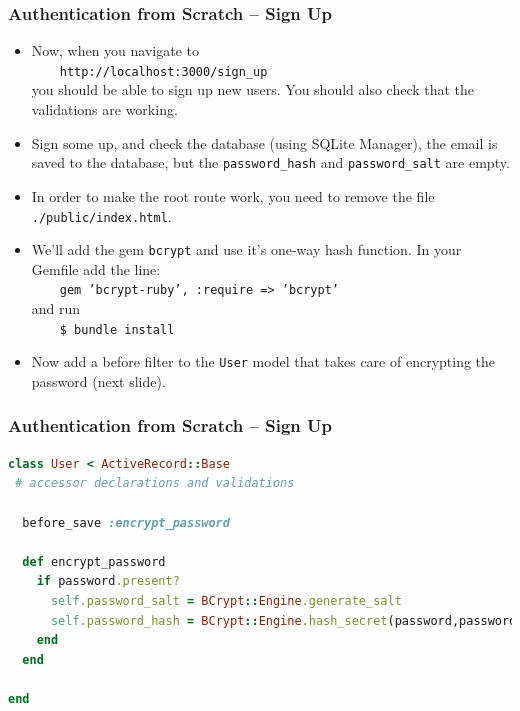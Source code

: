 \documentclass[t,handout]{beamer}
\begin{document}
\begin{frame}\frametitle{Authentication from Scratch -- Sign Up}
{\small
 \begin{itemize}

   \item Now, when you navigate to~\\
    \ \ \ \ {\tt http://localhost:3000/sign\_up} ~\\
    you should be able to sign up new users. \pause You should also check that the validations are working.
   \pause
   \item Sign some up, and check the database (using SQLite Manager), the email is saved to the database, but the {\tt password\_hash} and {\tt password\_salt} are empty.
   \pause
   \item In order to make the root route work, you need to remove the file {\tt ./public/index.html}.
   \pause
   \item We'll add the gem {\tt bcrypt} and use it's one-way hash function.  In your Gemfile add the line:~\\
   \ \ \ \ {\tt gem 'bcrypt-ruby', :require => 'bcrypt'}~\\
   and run~\\
    \ \ \ \ {\tt \$ bundle install}
    \pause
    \item Now add a before filter to the {\tt User} model that takes care of encrypting the password (next slide).
 \end{itemize}}
\end{frame} 

\begin{frame}[fragile]\frametitle{Authentication from Scratch -- Sign Up}
\begin{lstlisting}[frame=none,language=Ruby,basicstyle=\scriptsize\ttfamily\color{black},xleftmargin=2pt]
class User < ActiveRecord::Base
 # accessor declarations and validations
  
  before_save :encrypt_password
    
  def encrypt_password
    if password.present?
      self.password_salt = BCrypt::Engine.generate_salt
      self.password_hash = BCrypt::Engine.hash_secret(password,password_salt)
    end
  end
  
end
\end{lstlisting}
\end{frame}   
\end{document}
